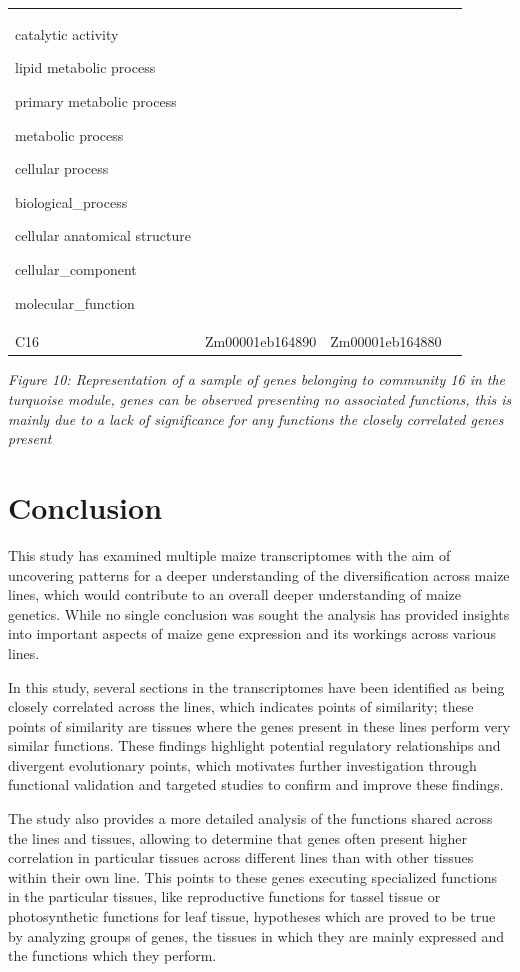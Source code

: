 \documentclass[
]{article}
\begin{document}
\begin{longtable}[]{@{}llll@{}}
\begin{minipage}[t]{0.22\columnwidth}
catalytic activity

lipid metabolic process

primary metabolic process

metabolic process

cellular process

biological\_process

cellular anatomical structure

cellular\_component

molecular\_function\strut
\end{minipage}\tabularnewline
C16 & Zm00001eb164890 & Zm00001eb164880 &\tabularnewline
\bottomrule
\end{longtable}

\emph{Figure 10: Representation of a sample of genes belonging to
community 16 in the turquoise module, genes can be observed presenting
no associated functions, this is mainly due to a lack of significance
for any functions the closely correlated genes present}

\hypertarget{conclusion}{%
\section{Conclusion}\label{conclusion}}

This study has examined multiple maize transcriptomes with the aim of
uncovering patterns for a deeper understanding of the diversification
across maize lines, which would contribute to an overall deeper
understanding of maize genetics. While no single conclusion was sought
the analysis has provided insights into important aspects of maize gene
expression and its workings across various lines.

In this study, several sections in the transcriptomes have been
identified as being closely correlated across the lines, which indicates
points of similarity; these points of similarity are tissues where the
genes present in these lines perform very similar functions. These
findings highlight potential regulatory relationships and divergent
evolutionary points, which motivates further investigation through
functional validation and targeted studies to confirm and improve these
findings.

The study also provides a more detailed analysis of the functions shared
across the lines and tissues, allowing to determine that genes often
present higher correlation in particular tissues across different lines
than with other tissues within their own line. This points to these
genes executing specialized functions in the particular tissues, like
reproductive functions for tassel tissue or photosynthetic functions for
leaf tissue, hypotheses which are proved to be true by analyzing groups
of genes, the tissues in which they are mainly expressed and the
functions which they perform.
\end{document}
